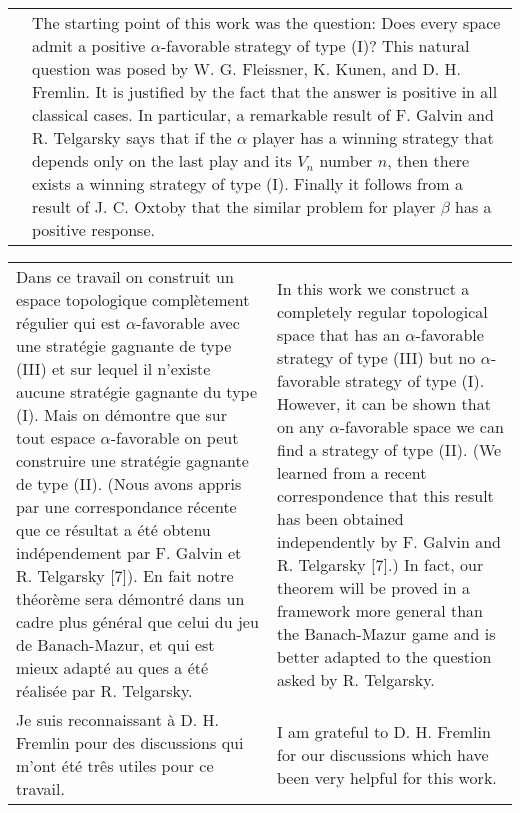 \documentclass[12pt]{article}
\theoremstyle{plain}
\theoremstyle{definition}
\theoremstyle{remark}
\begin{document}
\begin{tabular}{p{2.8in} p{2.8in}}
&

The starting point of this work was the question: Does every space admit a positive $\alpha$-favorable strategy of type (I)? This natural question was  posed by W. G. Fleissner, K. Kunen, and D. H. Fremlin. It is justified by the fact that the answer is positive in all classical cases. In particular, a remarkable result of F. Galvin and R. Telgarsky says that if the $\alpha$ player has a winning strategy that depends only on the last play and its $V_n$ number $n$, then there exists a winning strategy of type (I). Finally it follows from a result of J. C. Oxtoby that the similar problem for player $\beta$ has a positive response.

\end{tabular}

\begin{tabular}{p{2.8in} p{2.8in}}

Dans ce travail on construit un espace topologique compl\`etement r\'egulier qui est $\alpha$-favorable avec une strat\'egie gagnante de type (III) et sur lequel il n'existe aucune strat\'egie gagnante du type (I). Mais on d\'emontre que sur tout espace $\alpha$-favorable on peut construire une strat\'egie gagnante de type (II). (Nous avons appris par une correspondance r\'ecente que ce r\'esultat a \'et\'e obtenu ind\'ependement par F. Galvin et R. Telgarsky [7]). En fait notre th\'eor\`eme sera d\'emontr\'e dans un cadre plus g\'en\'eral que celui du jeu de Banach-Mazur, et qui est mieux adapt\'e au ques a \'et\'e r\'ealis\'ee par R. Telgarsky.

&

In this work we construct a completely regular topological space that has an $\alpha$-favorable strategy of type (III) but no $\alpha$-favorable strategy of type (I). However, it can be shown that on any $\alpha$-favorable space we can find a strategy of type (II). (We learned from a recent correspondence that this result has been obtained independently by F. Galvin and R. Telgarsky [7].) In fact, our theorem will be proved in a framework more general than the Banach-Mazur game and is better adapted to the question asked by R. Telgarsky.

\\

Je suis reconnaissant \`a D. H. Fremlin pour des discussions qui m'ont \'et\'e tr\^es utiles pour ce travail.

&

I am grateful to D. H. Fremlin for our discussions which have been very helpful for this work.


\end{tabular}
\end{document}
